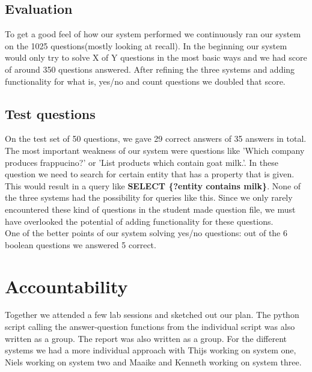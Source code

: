 \documentclass{article}
\begin{document}
\subsection*{Evaluation}
To get a good feel of how our system performed we continuously ran our system on the 1025 questions(mostly looking at recall). In the beginning our system would only try to solve X of Y questions in the most basic ways and we had score of around 350 questions answered. After refining the three systems and adding functionality for what is, yes/no and count questions we doubled that score.
\subsection*{Test questions}
On the test set of 50 questions, we gave 29 correct answers of 35 answers in total. The most important weakness of our system were questions like 'Which company produces frappucino?' or 'List products which contain goat milk.'. In these question we need to search for certain entity that has a property that is given. This would result in a query like \textbf{SELECT \{?entity contains milk\}}. None of the three systems had the possibility for queries like this. Since we only rarely encountered these kind of questions in the student made question file, we must have overlooked the potential of adding functionality for these questions.\\
One of the better points of our system solving yes/no questions: out of the 6 boolean questions we answered 5 correct.

\section*{Accountability}
Together we attended a few lab sessions and sketched out our plan. The python script calling the answer-question functions from the individual script was also written as a group. The report was also written as a group. For the different systems we had a more individual approach with Thijs working on system one, Niels working on system two and Maaike and Kenneth working on system three.
\end{document}
